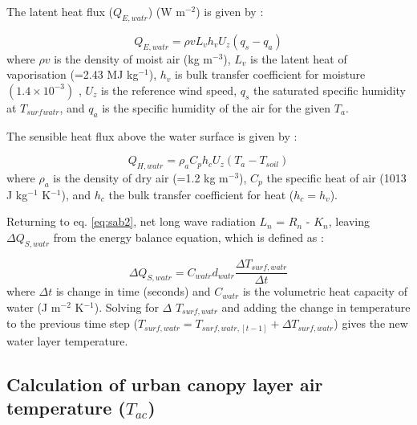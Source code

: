 \documentclass[gmd, manuscript]{copernicus}
\begin{document}
The latent heat flux (\ensuremath{Q_{E,watr}}) (W m$^{-2}$) is given by \cite{Arya2001}:

\begin{equation} 
\ensuremath{Q_{E,watr}} = \ensuremath{\rho v} \ensuremath{L_{v}} \ensuremath{h_{v}} \ensuremath{U_{z}} (\ensuremath{q_{s}} - \ensuremath{q_{a}})
\label{eq:lewtr} \end{equation} where \ensuremath{\rho v} is the density of moist air (kg m$^{-3}$), \ensuremath{L_{v}} is the latent heat of vaporisation (=2.43 MJ kg$^{-1}$), \ensuremath{h_{v}} is bulk transfer coefficient for moisture $(1.4\times10^{-3})$ \citep{Hicks1972,Jones2005}, \ensuremath{U_{z}} is the reference wind speed, \ensuremath{q_{s}} the saturated specific humidity at $T_{surf}$$_{watr}$, and \ensuremath{q_{a}} is the specific humidity of the air for the given \ensuremath{T_{a}}. 

The sensible heat flux above the water surface is given by \cite{MolinaMartinez2006}:


\begin{equation} 
Q_{H,watr} = \ensuremath{\rho_{a}} \ensuremath{C_{p}} \ensuremath{h_{c}} \ensuremath{U_{z}} (\ensuremath{T_{a}}-\ensuremath{T_{soil}})
\label{eq:hwtr} \end{equation} where \ensuremath{\rho_{a}} is the density of dry air (=1.2 kg m$^{-3}$), \ensuremath{C_{p}} the specific heat of air (1013 J kg$^{-1}$ K$^{-1}$), and \ensuremath{h_{c}} the bulk transfer coefficient for heat ($h_{c} = h_{v}$). 

Returning to eq. \ref{eq:sab2}, net long wave radiation \ensuremath{L_{n}} = \ensuremath{R_{n}} - \ensuremath{K_{n}}, leaving $\ensuremath{\Delta Q_{S,watr}}$ from the energy balance equation, which is defined as \citep{MolinaMartinez2006}:

\begin{equation} 
\ensuremath{\Delta Q_{S,watr}} = \ensuremath{C_{watr}} \ensuremath{d_{watr}} \frac{\Delta T_{surf,watr}}{\Delta t}
\label{eq:swrt} \end{equation} where $\Delta t$ is change in time (seconds) and \ensuremath{C_{watr}} is the volumetric heat capacity of water (J m$^{-2}$ K$^{-1}$). Solving for $\Delta$ $T_{surf,watr}$ and adding the change in temperature to the previous time step ($T_{surf,watr} = T_{surf,watr,[t-1]}  + \Delta T_{surf,watr}$) gives the new water layer temperature. 




\subsection{Calculation of urban canopy layer air temperature ($T_{ac}$) }\label{sec:calcTac}
\end{document}
